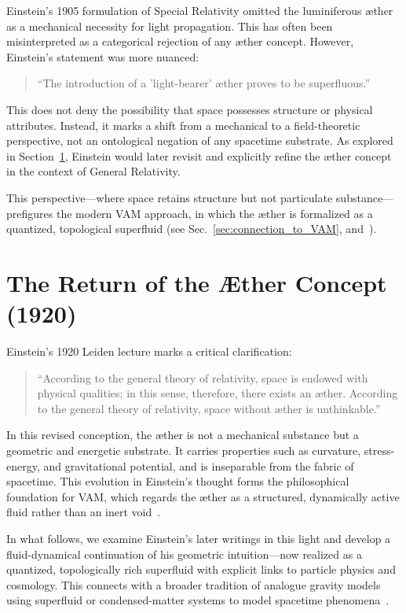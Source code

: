 Einstein’s 1905 formulation of Special Relativity omitted the luminiferous æther as a mechanical necessity for light propagation. This has often been misinterpreted as a categorical rejection of any æther concept. However, Einstein’s statement was more nuanced:
\begin{quote}
    ``The introduction of a 'light-bearer' æther proves to be superfluous.''
\end{quote}

This does not deny the possibility that space possesses structure or physical attributes. Instead, it marks a shift from a mechanical to a field-theoretic perspective, not an ontological negation of any spacetime substrate. As explored in Section~\ref{sec:einstein_return}, Einstein would later revisit and explicitly refine the æther concept in the context of General Relativity.

This perspective—where space retains structure but not particulate substance—prefigures the modern VAM approach, in which the æther is formalized as a quantized, topological superfluid (see Sec.~\ref{sec:connection_to_VAM}, and~\cite{VAM-8}).

\section{The Return of the Æther Concept (1920)}
\label{sec:einstein_return}

Einstein’s 1920 Leiden lecture marks a critical clarification:
\begin{quote}
    ``According to the general theory of relativity, space is endowed with physical qualities; in this sense, therefore, there exists an æther. According to the general theory of relativity, space without æther is unthinkable.''~\cite{einstein1920aether}
\end{quote}

In this revised conception, the æther is not a mechanical substance but a geometric and energetic substrate. It carries properties such as curvature, stress-energy, and gravitational potential, and is inseparable from the fabric of spacetime. This evolution in Einstein’s thought forms the philosophical foundation for VAM, which regards the æther as a structured, dynamically active fluid rather than an inert void~\cite{VAM-8}.

In what follows, we examine Einstein’s later writings in this light and develop a fluid-dynamical continuation of his geometric intuition—now realized as a quantized, topologically rich superfluid with explicit links to particle physics and cosmology.
This connects with a broader tradition of analogue gravity models using superfluid or condensed-matter systems to model spacetime phenomena~\cite{barcelo2005}.


